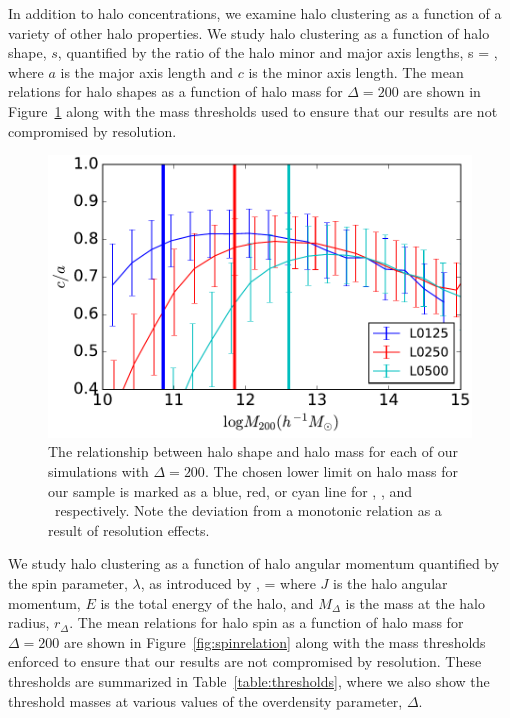 \documentclass[usenatbib]{mnras}
\begin{document}
In addition to halo concentrations, we examine halo clustering as a function of a variety of other 
halo properties. We study halo clustering as a function of halo shape, $s$, 
quantified by the ratio of the halo minor and major axis lengths, 
%
\beq
s = ,
\eeq
%
where $a$ is the major axis length and $c$ is the minor axis length. 
The mean relations for halo shapes as a function of halo mass for $\Delta=200$ 
are shown in Figure~\ref{fig:srelation} along with the mass 
thresholds used to ensure that our results are not compromised by 
resolution.


\begin{figure}
\centering
\includegraphics[width=.5\textwidth]{masscut_shape_d200.pdf}
\caption{
The relationship between halo shape and 
halo mass for each of our simulations with $\Delta =200$. 
The chosen lower limit on halo mass for our sample is marked as 
a blue, red, or cyan line for \simA, \simB, and \simC \ respectively. 
Note the deviation from a monotonic relation as a result of resolution effects.
}
\label{fig:srelation}
\end{figure}

We study halo clustering as a function of halo angular momentum quantified 
by the spin parameter, $\lambda$, as introduced by \citep{peebles69},
\beq
\lambda = 
\eeq
where $J$ is the halo angular momentum, $E$ is the total energy of the 
halo, and $M_{\Delta}$ is the mass at the halo radius, $r_{\Delta}$. 
The mean relations for halo spin as a function of halo mass for $\Delta=200$ 
are shown in Figure~\ref{fig:spinrelation} along with the mass thresholds 
enforced to ensure that our results are not compromised by resolution. 
These thresholds are summarized in Table~\ref{table:thresholds}, where 
we also show the threshold masses at various values of the overdensity 
parameter, $\Delta$.
\end{document}
